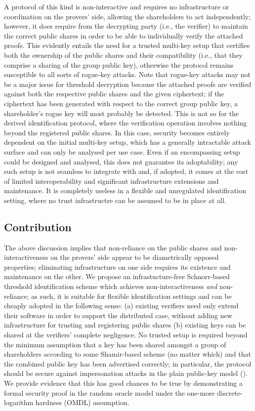 \documentclass[10pt, psamsfonts, reqno]{amsart}
\theoremstyle{definition}
\theoremstyle{remark}
\numberwithin{equation}{section}
\begin{document}
A protocol of this kind is non-interactive and requires
no infrastructure or coordination on the provers' side,
allowing the shareholders to act independently; however,
it does require from the decrypting party (i.e., the verifier)
to maintain the correct public shares
in order to be able to individually verify the attached proofs.
This evidently entails the need for a trusted multi-key setup
that certifies both the ownership of the public shares
and their compatibility (i.e., that they
comprise a sharing of the group public key),
otherwise the protocol remains susceptible
to all sorts of rogue-key attacks.
Note that rogue-key attacks may not be a major issue
for threshold decryption because the attached
proofs are verified against both the respective public shares
and the given ciphertext; if the ciphertext has been generated
with respect to the correct group public key,
a shareholder's rogue key will
most probably be detected. This is not so for the derived
identification protocol,
where the verification operation involves nothing
beyond the registered public shares.
In this case, security becomes
entirely dependent on the initial multi-key setup,
which has a generally intractable attack surface
and can only be analysed per use case.
Even if an encompassing setup
could be designed and analysed,
this does not guarantee its adoptability;
any such setup is not seamless to integrate with and,
if adopted, it comes at the cost of limited interoperability
and significant infrastructure extensions and maintenance.
It is completely useless
in a flexible and unregulated identification setting,
where no trust infrastructre can be assumed to be
in place at all.

\subsection{Contribution}\label{section_contribution}
The above discussion implies
that non-reliance on the public shares
and non-interactiveness on the provers' side appear to be
diametrically opposed properties;
eliminating infrastructure on one side
requires its existence and maintenance on the other.
We propose an infrastucture-free
Schnorr-based threshold identification scheme
which achieves non-interactiveness \textit{and} non-reliance;
as such, it is suitable for flexible identification
settings and can be cheaply adopted
in the following sense: (a) existing verifiers
need only extend their software
in order to support the distributed case,
without adding new infrastructure
for trusting and registering
public shares (b) existing keys
can be shared at the verifiers' complete negligence.
No trusted setup is required beyond
the minimum assumption that a key has been
shared amongst a group of shareholders according to some
Shamir-based scheme (no matter which)
and that the combined public key has been advertised
correctly; in particular,
the protocol should be secure against
impersonation attacks in the plain public-key model
(\cite{paper_bellare_musig}).
We provide evidence that this has good chances to be true
by demonstrating a formal security proof in the random oracle model
under the one-more discrete-logarithm hardness (OMDL) assumption.
\end{document}
